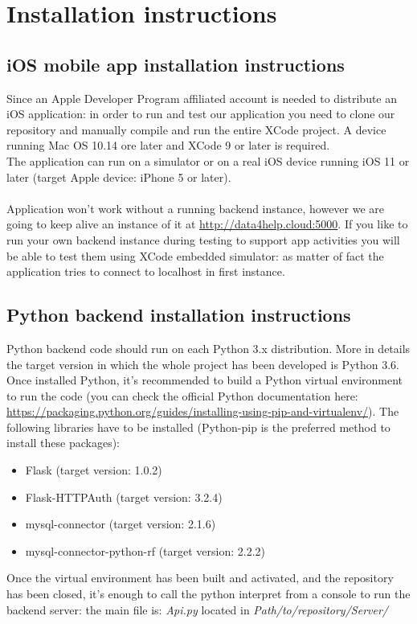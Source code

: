 \documentclass{article}
\begin{document}
\section{Installation instructions}

\subsection{iOS mobile app installation instructions}
Since an Apple Developer Program affiliated account is needed to distribute an iOS application: in order to run and test our application you need to clone our repository and manually compile and run the entire XCode project. A device running Mac OS 10.14 ore later and XCode 9 or later is required. \\
	The application can run on a simulator or on a real iOS device running iOS 11 or later (target Apple device: iPhone 5 or later).	\\\\
	Application won't work without a running backend instance, however we are going to keep alive an instance of it at \url{http://data4help.cloud:5000}.
	If you like to run your own backend instance during testing to support app activities you will be able to test them using XCode embedded simulator: as matter of fact the application tries to connect to localhost in first instance.
\subsection{Python backend installation instructions}
Python backend code should run on each Python 3.x distribution. More in details the target version in which the whole project has been developed is Python 3.6.\\
Once installed Python, it's recommended to build a Python virtual environment to run the code (you can check the official Python documentation here: \url{https://packaging.python.org/guides/installing-using-pip-and-virtualenv/}). The following libraries have to be installed (Python-pip is the preferred method to install these packages):
\begin{itemize}
	\item Flask (target version: 1.0.2)
	\item Flask-HTTPAuth (target version: 3.2.4)
	\item mysql-connector (target version: 2.1.6)
	\item mysql-connector-python-rf (target version: 2.2.2)
\end{itemize}
Once the virtual environment has been built and activated, and the repository has been closed, it's enough to call the python interpret from a console to run the backend server: the main file is: \textit{Api.py} located in \textit{Path/to/repository/Server/} 
\end{document}
